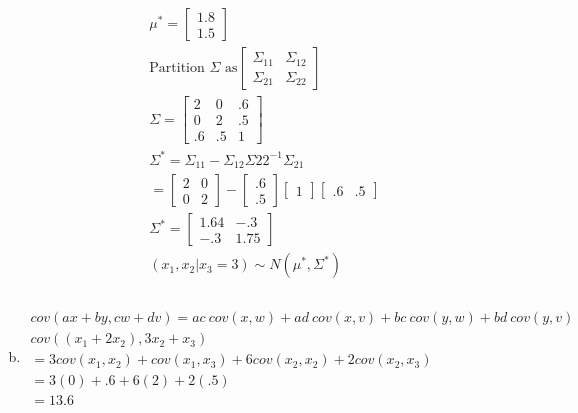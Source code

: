 \documentclass{article}
\begin{document}
\begin{flushleft}
\begin{enumerate}[(a)]
\begin{multline*}
\mu^*=\begin{bmatrix}
1.8\\
1.5
\end{bmatrix}\\
\text{Partition } \Sigma \text{ as} \begin{bmatrix}
\Sigma_{11} & \Sigma_{12}\\
\Sigma_{21} & \Sigma_{22}
\end{bmatrix}\\
\Sigma=\left[\begin{array}{cc|c}
2 & 0 &.6 \\ 
0 & 2 &.5\\
\hline
.6 & .5&1
\end{array}\right]\\
\Sigma^*=\Sigma_{11}-\Sigma_{12}\Sigma{22}^{-1}\Sigma_{21}\\
=\begin{bmatrix}
2&0\\
0&2
\end{bmatrix}-\begin{bmatrix}
.6\\
.5
\end{bmatrix}\begin{bmatrix}
1
\end{bmatrix}\begin{bmatrix}
.6&.5
\end{bmatrix}\\
\Sigma^*=\begin{bmatrix}
1.64 & -.3\\
-.3 & 1.75
\end{bmatrix}\\
(x_1,x_2|x_3=3)\sim N(\mu^*,\Sigma^*)\\
\end{multline*}

	\item 
\begin{multline*}\\
cov(ax+by,cw+dv)=ac \ cov(x,w)+ ad \ cov(x,v)+ bc \ cov(y,w)+ bd \ cov(y,v)\\
cov((x_1+2x_2),3x_2+x_3)\\
=3cov(x_1,x_2)+cov(x_1,x_3)+6cov(x_2,x_2)+2cov(x_2,x_3)\\
=3(0)+.6+6(2)+2(.5)\\
=13.6\\
\end{multline*}
	
\end{enumerate}


\end{flushleft}
\end{document}
